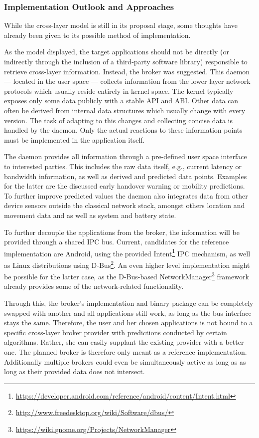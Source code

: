 \subsubsection{Implementation Outlook and Approaches}

While the cross-layer model is still in its proposal stage, some thoughts have already been given to its possible method of implementation.

As the model displayed, the target applications should not be directly (or indirectly through the inclusion of a third-party software library) responsible to retrieve cross-layer information. Instead, the broker was suggested. This daemon --- located in the user space --- collects information from the lower layer network protocols which usually reside entirely in kernel space. The kernel typically exposes only some data publicly with a stable \gls{API} and \gls{ABI}. Other data can often be derived from internal data structures which usually change with every version. The task of adapting to this changes and collecting concise data is handled by the daemon. Only the actual reactions to these information points must be implemented in the application itself.

The daemon provides all information through a pre-defined user space interface to interested parties. This includes the raw data itself, e.g., current latency or bandwidth information, as well as derived and predicted data points. Examples for the latter are the discussed early handover warning or mobility predictions. To further improve predicted values the daemon also integrates data from other device sensors outside the classical network stack, amongst others location and movement data and as well as system and battery state.

To further decouple the applications from the broker, the information will be provided through a shared \gls{IPC} bus. Current, candidates for the reference implementation are Android, using the provided Intent\footnote{\url{https://developer.android.com/reference/android/content/Intent.html}} \gls{IPC} mechanism, as well as Linux distributions using D-Bus\footnote{\url{http://www.freedesktop.org/wiki/Software/dbus/}}. An even higher level implementation might be possible for the latter case, as the D-Bus-based NetworkManager\footnote{\url{https://wiki.gnome.org/Projects/NetworkManager}} framework already provides some of the network-related functionality.

Through this, the broker's implementation and binary package can be completely swapped with another and all applications still work, as long as the bus interface stays the same. Therefore, the user and her chosen applications is not bound to a specific cross-layer broker provider with predictions conducted by certain algorithms. Rather, she can easily supplant the existing provider with a better one. The planned broker is therefore only meant as a reference implementation. Additionally multiple brokers could even be simultaneously active as long as as long as their provided data does not intersect.

